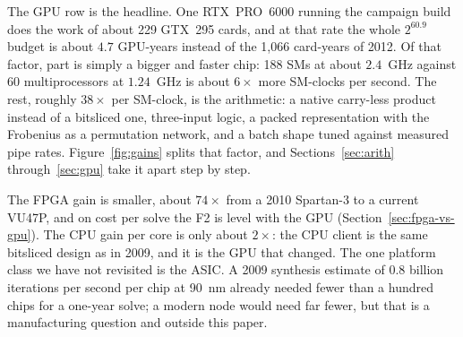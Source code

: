The GPU row is the headline. One RTX~PRO~6000 running the campaign
build does the work of about 229 GTX~295 cards, and at that rate the
whole $2^{60.9}$ budget is about $4.7$ GPU-years instead of the 1{,}066
card-years of 2012. Of that factor, part is simply a bigger and faster
chip: 188 SMs at about $2.4$~GHz against 60 multiprocessors at
$1.24$~GHz is about $6\times$ more SM-clocks per second. The rest, roughly
$38\times$ per SM-clock, is the arithmetic: a native carry-less product
instead of a bitsliced one, three-input logic, a packed representation
with the Frobenius as a permutation network, and a batch shape tuned
against measured pipe rates. Figure~\ref{fig:gains} splits that factor, and Sections~\ref{sec:arith}
through~\ref{sec:gpu} take it apart step by step.

The FPGA gain is smaller, about $74\times$ from a 2010 Spartan-3 to a
current VU47P, and on cost per solve the F2 is level with the GPU
(Section~\ref{sec:fpga-vs-gpu}). The CPU gain per core is only about
$2\times$: the CPU client is the same bitsliced design as in 2009, and
it is the GPU that changed. The one platform class we have not
revisited is the ASIC. A 2009 synthesis estimate of $0.8$ billion
iterations per second per chip at 90~nm already needed fewer than a
hundred chips for a one-year solve; a modern node would need far
fewer, but that is a manufacturing question and outside this paper.
